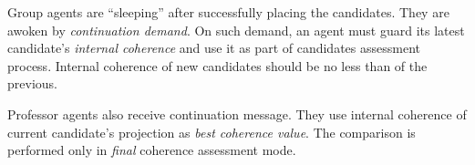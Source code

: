\documentclass[../../ThesisDoc]{subfiles}
\begin{document}
Group agents are ``sleeping'' after successfully placing the candidates.
They are awoken by \emph{continuation demand}. On such demand, an agent
must guard its latest candidate's \emph{internal coherence} and use it as part
of candidates assessment process.
Internal coherence of new candidates should be no less than of the previous.

Professor agents also receive continuation message. They use internal coherence
of current candidate's projection as \emph{best coherence value}.
The comparison is performed only in \emph{final} coherence assessment mode.
\end{document}
